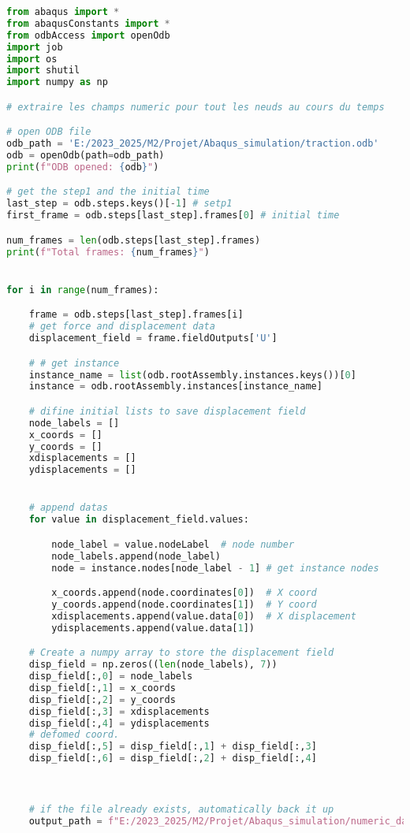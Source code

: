 \documentclass[12pt,a4paper]{article}
\begin{document}
\begin{lstlisting}[language=Python, caption={Extraction des champs numériques}]
from abaqus import *
from abaqusConstants import *
from odbAccess import openOdb
import job
import os
import shutil
import numpy as np

# extraire les champs numeric pour tout les neuds au cours du temps

# open ODB file
odb_path = 'E:/2023_2025/M2/Projet/Abaqus_simulation/traction.odb'
odb = openOdb(path=odb_path)
print(f"ODB opened: {odb}")

# get the step1 and the initial time 
last_step = odb.steps.keys()[-1] # setp1
first_frame = odb.steps[last_step].frames[0] # initial time

num_frames = len(odb.steps[last_step].frames)
print(f"Total frames: {num_frames}")


for i in range(num_frames):

    frame = odb.steps[last_step].frames[i]
    # get force and displacement data
    displacement_field = frame.fieldOutputs['U']

    # # get instance
    instance_name = list(odb.rootAssembly.instances.keys())[0]
    instance = odb.rootAssembly.instances[instance_name]

    # difine initial lists to save displacement field
    node_labels = []
    x_coords = []
    y_coords = []
    xdisplacements = []
    ydisplacements = []


    # append datas
    for value in displacement_field.values:

        node_label = value.nodeLabel  # node number
        node_labels.append(node_label) 
        node = instance.nodes[node_label - 1] # get instance nodes

        x_coords.append(node.coordinates[0])  # X coord
        y_coords.append(node.coordinates[1])  # Y coord
        xdisplacements.append(value.data[0])  # X displacement
        ydisplacements.append(value.data[1])

    # Create a numpy array to store the displacement field
    disp_field = np.zeros((len(node_labels), 7))
    disp_field[:,0] = node_labels
    disp_field[:,1] = x_coords
    disp_field[:,2] = y_coords
    disp_field[:,3] = xdisplacements 
    disp_field[:,4] = ydisplacements
    # defomed coord.
    disp_field[:,5] = disp_field[:,1] + disp_field[:,3] 
    disp_field[:,6] = disp_field[:,2] + disp_field[:,4]



    # if the file already exists, automatically back it up
    output_path = f"E:/2023_2025/M2/Projet/Abaqus_simulation/numeric_data/champs_deformation/deformation_data_{i}.csv"


\end{lstlisting}
\end{document}
